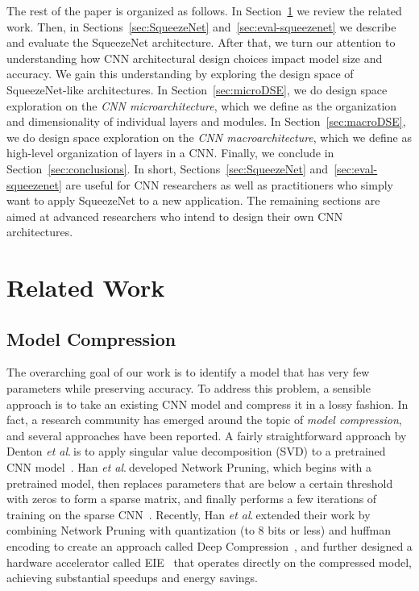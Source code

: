 \documentclass{article} %
\newcommand{\etal}{\textit{et al}.$~$}
\renewcommand{\cite}{\citep}
\def\vsp{\vspace{-0.15in}}
\begin{document}
The rest of the paper is organized as follows. 
In Section~\ref{sec:related} we review the related work.
Then, in Sections~\ref{sec:SqueezeNet} and~\ref{sec:eval-squeezenet} we describe and evaluate the SqueezeNet architecture. %
After that, we turn our attention to understanding how CNN architectural design choices impact model size and accuracy.
We gain this understanding by exploring the design space of SqueezeNet-like architectures.
In Section~\ref{sec:microDSE}, we do design space exploration on the {\em CNN microarchitecture}, which we define as the organization and dimensionality of individual layers and modules.
In Section~\ref{sec:macroDSE}, we do design space exploration on the {\em CNN macroarchitecture}, which we define as high-level organization of layers in a CNN.
Finally, we conclude in Section~\ref{sec:conclusions}.
In short, Sections~\ref{sec:SqueezeNet} and~\ref{sec:eval-squeezenet} are useful for CNN researchers as well as practitioners who simply want to apply SqueezeNet to a new application.
The remaining sections are aimed at advanced researchers who intend to design their own CNN architectures. 

\section{Related Work}
\label{sec:related}
\vsp

\subsection{Model Compression}
\label{sec:related-model-compression}
\vsp

The overarching goal of our work is to identify a model that has very few parameters while preserving accuracy.
To address this problem, a sensible approach is to take an existing CNN model and compress it in a lossy fashion.
In fact, a research community has emerged around the topic of {\em model compression}, and several approaches have been reported.
A fairly straightforward approach by Denton \etal is to apply singular value decomposition (SVD) to a pretrained CNN model~\cite{facebook-compress-2014}.
Han \etal developed Network Pruning, which begins with a pretrained model, then replaces parameters that are below a certain threshold with zeros to form a sparse matrix, and finally performs a few iterations of training on the sparse CNN~\cite{dally2015-1}.
Recently, Han \etal extended their work by combining Network Pruning with quantization (to 8 bits or less) and huffman encoding to create an approach called Deep Compression~\cite{dally2015-2}, and further designed a hardware accelerator called EIE~\cite{EIE} that operates directly on the compressed model, achieving substantial speedups and energy savings.
\end{document}
